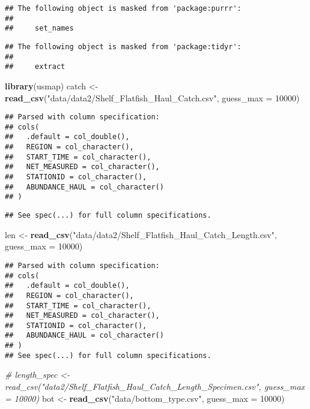 \documentclass[
]{article}
\newenvironment{Shaded}{\begin{snugshade}}{\end{snugshade}}
\newcommand{\CommentTok}[1]{\textcolor[rgb]{0.56,0.35,0.01}{\textit{#1}}}
\newcommand{\DataTypeTok}[1]{\textcolor[rgb]{0.13,0.29,0.53}{#1}}
\newcommand{\DecValTok}[1]{\textcolor[rgb]{0.00,0.00,0.81}{#1}}
\newcommand{\KeywordTok}[1]{\textcolor[rgb]{0.13,0.29,0.53}{\textbf{#1}}}
\newcommand{\NormalTok}[1]{#1}
\newcommand{\StringTok}[1]{\textcolor[rgb]{0.31,0.60,0.02}{#1}}
\begin{document}
\begin{verbatim}
## The following object is masked from 'package:purrr':
## 
##     set_names
\end{verbatim}

\begin{verbatim}
## The following object is masked from 'package:tidyr':
## 
##     extract
\end{verbatim}

\begin{Shaded}
\begin{Highlighting}[]
\KeywordTok{library}\NormalTok{(usmap)}
\NormalTok{catch <-}\StringTok{ }\KeywordTok{read_csv}\NormalTok{(}\StringTok{"data/data2/Shelf_Flatfish_Haul_Catch.csv"}\NormalTok{, }\DataTypeTok{guess_max =} \DecValTok{10000}\NormalTok{)}
\end{Highlighting}
\end{Shaded}

\begin{verbatim}
## Parsed with column specification:
## cols(
##   .default = col_double(),
##   REGION = col_character(),
##   START_TIME = col_character(),
##   NET_MEASURED = col_character(),
##   STATIONID = col_character(),
##   ABUNDANCE_HAUL = col_character()
## )
\end{verbatim}

\begin{verbatim}
## See spec(...) for full column specifications.
\end{verbatim}

\begin{Shaded}
\begin{Highlighting}[]
\NormalTok{len <-}\StringTok{ }\KeywordTok{read_csv}\NormalTok{(}\StringTok{"data/data2/Shelf_Flatfish_Haul_Catch_Length.csv"}\NormalTok{, }\DataTypeTok{guess_max =} \DecValTok{10000}\NormalTok{)}
\end{Highlighting}
\end{Shaded}

\begin{verbatim}
## Parsed with column specification:
## cols(
##   .default = col_double(),
##   REGION = col_character(),
##   START_TIME = col_character(),
##   NET_MEASURED = col_character(),
##   STATIONID = col_character(),
##   ABUNDANCE_HAUL = col_character()
## )
## See spec(...) for full column specifications.
\end{verbatim}

\begin{Shaded}
\begin{Highlighting}[]
\CommentTok{# length_spec <- read_csv("data2/Shelf_Flatfish_Haul_Catch_Length_Specimen.csv", guess_max = 10000)}
\NormalTok{bot <-}\StringTok{ }\KeywordTok{read_csv}\NormalTok{(}\StringTok{"data/bottom_type.csv"}\NormalTok{, }\DataTypeTok{guess_max =} \DecValTok{10000}\NormalTok{)}
\end{Highlighting}
\end{Shaded}
\end{document}
